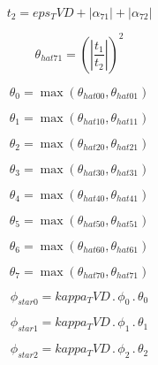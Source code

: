 \documentclass{article}
\begin{document}
\begin{dmath}t_{2} = eps_TVD + \left|{\alpha_{71}}\right| + \left|{\alpha_{72}}\right|\end{dmath}

\begin{dmath}\theta_{hat 71} = \left(\left|{\frac{t_{1}}{t_{2}}}\right| \right)^{2}\end{dmath}

\begin{dmath}\theta_{0} = \max\left(\theta_{hat 00}, \theta_{hat 01}\right)\end{dmath}

\begin{dmath}\theta_{1} = \max\left(\theta_{hat 10}, \theta_{hat 11}\right)\end{dmath}

\begin{dmath}\theta_{2} = \max\left(\theta_{hat 20}, \theta_{hat 21}\right)\end{dmath}

\begin{dmath}\theta_{3} = \max\left(\theta_{hat 30}, \theta_{hat 31}\right)\end{dmath}

\begin{dmath}\theta_{4} = \max\left(\theta_{hat 40}, \theta_{hat 41}\right)\end{dmath}

\begin{dmath}\theta_{5} = \max\left(\theta_{hat 50}, \theta_{hat 51}\right)\end{dmath}

\begin{dmath}\theta_{6} = \max\left(\theta_{hat 60}, \theta_{hat 61}\right)\end{dmath}

\begin{dmath}\theta_{7} = \max\left(\theta_{hat 70}, \theta_{hat 71}\right)\end{dmath}

\begin{dmath}\phi_{star 0} = kappa_TVD \,.\, \phi_{0} \,.\, \theta_{0}\end{dmath}

\begin{dmath}\phi_{star 1} = kappa_TVD \,.\, \phi_{1} \,.\, \theta_{1}\end{dmath}

\begin{dmath}\phi_{star 2} = kappa_TVD \,.\, \phi_{2} \,.\, \theta_{2}\end{dmath}
\end{document}
